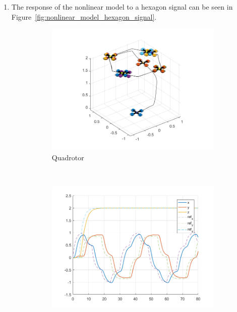 \documentclass[11pt]{article}
\begin{document}
\begin{enumerate}
    \item The response of the nonlinear model to a hexagon signal can be
    seen in Figure~\ref{fig:nonlinear_model_hexagon_signal}.
    \begin{figure}[ht]
        \centering
        \begin{subfigure}[c]{0.3\linewidth}
            \centering
            \includegraphics[width=\linewidth]{Plots_12_NonlinearModel_Hexagon/01}
            \caption{Quadrotor}
        \end{subfigure}
        ~
        \begin{subfigure}[c]{0.3\linewidth}
            \centering
            \includegraphics[width=\linewidth]{Plots_12_NonlinearModel_Hexagon/02}

\end{subfigure}
\end{figure}
\end{enumerate}
\end{document}
